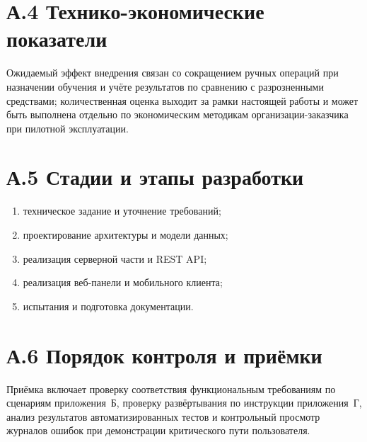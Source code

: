 \section*{А.4 Технико-экономические показатели}

Ожидаемый эффект внедрения связан со сокращением ручных операций при назначении обучения и учёте результатов по сравнению с разрозненными средствами; количественная оценка выходит за рамки настоящей работы и может быть выполнена отдельно по экономическим методикам организации-заказчика при пилотной эксплуатации.

\section*{А.5 Стадии и этапы разработки}

\begin{enumerate}
  \item техническое задание и уточнение требований;
  \item проектирование архитектуры и модели данных;
  \item реализация серверной части и REST API;
  \item реализация веб-панели и мобильного клиента;
  \item испытания и подготовка документации.
\end{enumerate}

\section*{А.6 Порядок контроля и приёмки}

Приёмка включает проверку соответствия функциональным требованиям по сценариям приложения~Б, проверку развёртывания по инструкции приложения~Г, анализ результатов автоматизированных тестов и контрольный просмотр журналов ошибок при демонстрации критического пути пользователя.
